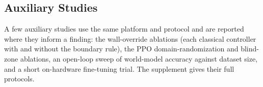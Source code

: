 \subsection{Auxiliary Studies}

A few auxiliary studies use the same platform and protocol and are reported where they inform a finding: the wall-override ablations (each classical controller with and without the boundary rule), the PPO domain-randomization and blind-zone ablations, an open-loop sweep of world-model accuracy against dataset size, and a short on-hardware fine-tuning trial.
The supplement gives their full protocols.
